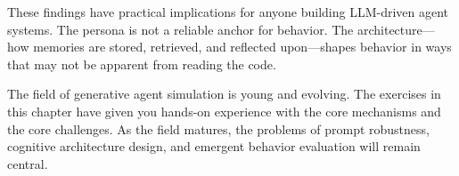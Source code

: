 These findings have practical implications for anyone building LLM-driven agent systems. The persona is not a reliable anchor for behavior. The architecture---how memories are stored, retrieved, and reflected upon---shapes behavior in ways that may not be apparent from reading the code.

The field of generative agent simulation is young and evolving. The exercises in this chapter have given you hands-on experience with the core mechanisms and the core challenges. As the field matures, the problems of prompt robustness, cognitive architecture design, and emergent behavior evaluation will remain central.



